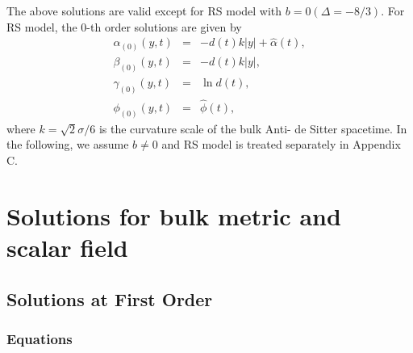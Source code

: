 \documentclass[a4paper,11pt]{article}
\begin{document}
The above solutions are valid except for RS model with 
$b =0 (\Delta=-8/3)$. For RS model, the 0-th order solutions
are given by 
\begin{eqnarray}
\alpha_{(0)}(y,t) &=& -d(t) k |y|  + \hat{\alpha}(t), \\
\beta_{(0)}(y,t) &=& -d(t) k|y|,  \\
\gamma_{(0)}(y,t) &=& \ln d(t), \\
\phi_{(0)}(y,t) &=& \hat{\phi}(t),
\end{eqnarray} 
where $k=\sqrt{2} \sigma/6$ is the curvature scale of the bulk Anti-
de Sitter spacetime. In the following, we assume $b \neq 0$ and RS model is 
treated separately in Appendix C. 

\section{Solutions for bulk metric and scalar field}

\subsection{Solutions at First Order}

\subsubsection{Equations}
\end{document}
